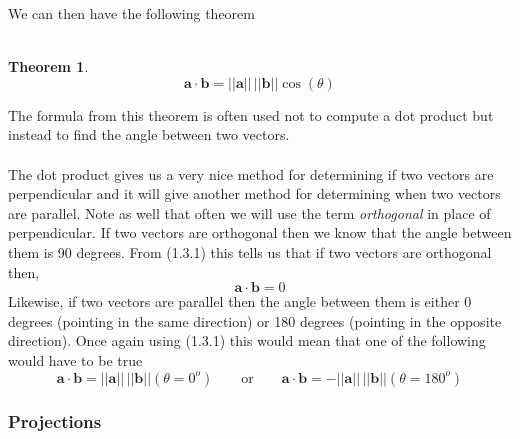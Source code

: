 \documentclass[10pt,reqno]{book}
\theoremstyle{definition}
\newtheorem{theorem}{Theorem}[section]
\renewcommand{\vec}[1]{\mathbf{#1}}
\begin{document}
	\begin{center}
	\end{center}
	We can then have the following theorem\\ \\
	\begin{theorem}
		\[\vec{a} \cdot \vec{b} = ||\vec{a}|| \, ||\vec{b}||\cos(\theta)\]
	\end{theorem}
	\noindent The formula from this theorem is often used not to compute a dot product but instead to find the angle between two vectors.\\ \\
	The dot product gives us a very nice method for determining if two vectors are perpendicular and it will give another method for determining when two vectors are parallel.  Note as well that often we will use the term \textit{orthogonal} in place of perpendicular. If two vectors are orthogonal then we know that the angle between them is 90 degrees. From (1.3.1) this tells us that if two vectors are orthogonal then,
	\[ \vec{a} \cdot \vec{b} = 0 \]
	Likewise, if two vectors are parallel then the angle between them is either 0 degrees (pointing in the same direction) or 180 degrees (pointing in the opposite direction). Once again using (1.3.1) this would mean that one of the following would have to be true
	\[ \vec{a} \cdot \vec{b} = ||\vec{a}|| \, ||\vec{b}|| (\theta = 0^o) \qquad \text{or} \qquad \vec{a} \cdot \vec{b} = -||\vec{a}|| \, ||\vec{b}|| (\theta = 180^o) \]

	\subsubsection*{Projections}
\end{document}
